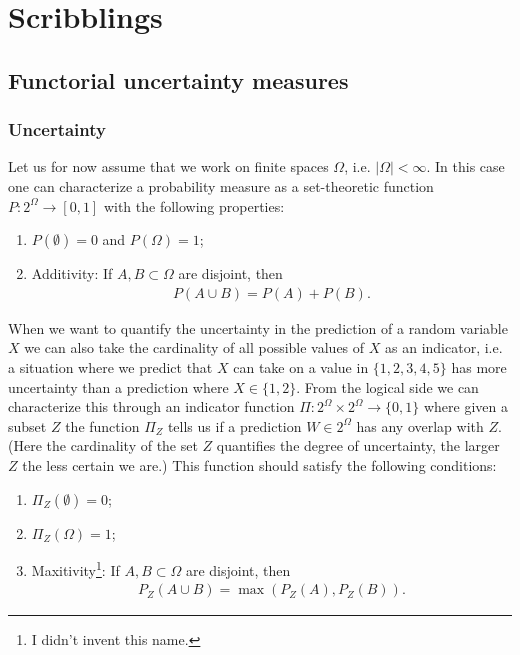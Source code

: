 \chapter{Scribblings}
\section{Functorial uncertainty measures}
\subsection{Uncertainty}

    Let us for now assume that we work on finite spaces $\Omega$, i.e. $|\Omega|<\infty$. In this case one can characterize a probability measure as a set-theoretic function $P:2^\Omega\rightarrow[0, 1]$ with the following properties:
    \begin{enumerate}
        \item $P(\emptyset) = 0$ and $P(\Omega) = 1$;
        \item Additivity: If $A,B\subset\Omega$ are disjoint, then
            \begin{gather}
                \label{scrib:additive}
                P(A\cup B) = P(A) + P(B).
            \end{gather}
    \end{enumerate}
    When we want to quantify the uncertainty in the prediction of a random variable $X$ we can also take the cardinality of all possible values of $X$ as an indicator, i.e. a situation where we predict that $X$ can take on a value in $\{1, 2, 3, 4, 5\}$ has more uncertainty than a prediction where $X\in\{1, 2\}$. From the logical side we can characterize this through an indicator function $\Pi:2^\Omega\times2^\Omega\rightarrow\{0, 1\}$ where given a subset $Z$ the function $\Pi_Z$ tells us if a prediction $W\in2^\Omega$ has any overlap with $Z$. (Here the cardinality of the set $Z$ quantifies the degree of uncertainty, the larger $Z$ the less certain we are.) This function should satisfy the following conditions:
    \begin{enumerate}
        \item $\Pi_Z(\emptyset) = 0$;
        \item $\Pi_Z(\Omega) = 1$;
        \item Maxitivity\footnote{I didn't invent this name.}: If $A,B\subset\Omega$ are disjoint, then
            \begin{gather}
                \label{scrib:maxitive}
                P_Z(A\cup B) = \max(P_Z(A), P_Z(B)).
            \end{gather}
    \end{enumerate}

